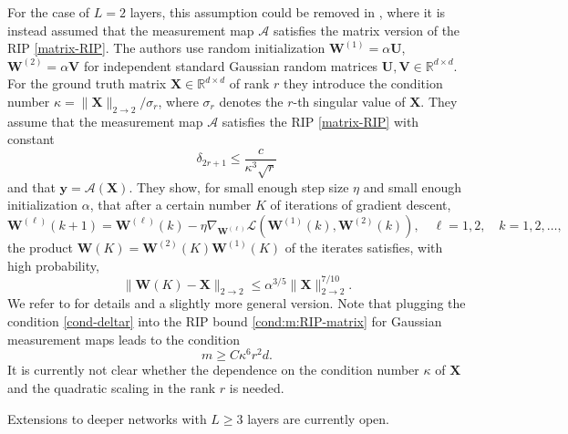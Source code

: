 \documentclass{svproc}
\newcommand{\corr}[1]{#1}
\newcommand{\bA}{\boldsymbol{A}}
\newcommand{\bU}{\boldsymbol{U}}
\newcommand{\bV}{\boldsymbol{V}}
\newcommand{\bW}{\boldsymbol{W}}
\newcommand{\bX}{\boldsymbol{X}}
\newcommand{\by}{\boldsymbol{y}}
\newcommand{\0}{\boldsymbol{0}}
\newcommand{\1}{\boldsymbol{1}}
\renewcommand{\tilde}{\widetilde}
\def\R{\mathbb{R}}
\def\bWprod{\tilde{\bW}}
\begin{document}
For the case of $L=2$ layers, this assumption could be removed in \cite{sost25,stoger2021small,jin2023incremental}, where it is instead assumed that the measurement map $\mathcal{A}$ satisfies the matrix version of the RIP \eqref{matrix-RIP}. %
The authors use random initialization $\bW^{(1)} = \alpha \bU$, $\bW^{(2)} = \alpha \bV$ for independent standard Gaussian random matrices $\bU, \bV \in \R^{d \times d}$. For the ground truth matrix $\bX \in \R^{d \times d}$ of rank $r$ they introduce the condition number $\kappa = \|\bX\|_{2 \to 2}/\sigma_r$, where $\sigma_r$ denotes the $r$-th singular value of $\bX$. They assume that the measurement map $\mathcal{A}$ satisfies the RIP \eqref{matrix-RIP} with constant
\begin{equation}\label{cond-deltar}
\delta_{2r+1} \leq \frac{c}{\kappa^3 \sqrt{r}}
\end{equation}
and that $\by = \mathcal{A}(\bX)$.
They show, for small enough step size $\eta$ and small enough initialization
$\alpha$, that after a certain number $K$ of iterations of gradient descent,
\[
\bW^{(\ell)}(k+1) = \bW^{(\ell)}(k) - \eta \nabla_{\bW^{(\ell)}}\mathcal{L}(\bW^{(1)}(k),\bW^{(2)}(k)), \quad \ell=1,2, \quad k=1,2,\hdots,
\]
the product $\bW(K) = \bW^{(2)}(K)\bW^{(1)}(K)$ of the iterates  satisfies, with high probability,
\[
\|\bW(K) - \bX\|_{2 \to 2} \leq \alpha^{3/5}\|\bX\|_{2 \to 2}^{7/10}.
\]
We refer to \cite[Theorem 3.3]{sost25} for details and a slightly more general version. Note that
\corr{plugging} the condition \eqref{cond-deltar} into the RIP bound
\eqref{cond:m:RIP-matrix} for Gaussian measurement maps leads to the condition
\[
m \geq C \kappa^6 r^{2} d.
\]
It is currently not clear whether the dependence on the condition number $\kappa$ of $\bX$ and the quadratic scaling in the rank $r$ is needed.

Extensions to deeper networks with $L\geq 3$ layers are currently open.

\end{document}
